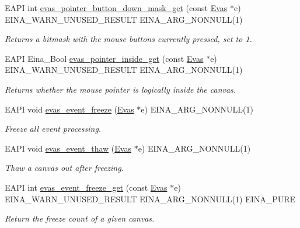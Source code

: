 \begin{DoxyCompactItemize}
EAPI int \hyperlink{group__Evas__Pointer__Group_gaae658f627d7f31b051345e45377c3580}{evas\_\-pointer\_\-button\_\-down\_\-mask\_\-get} (const \hyperlink{group__Evas__Canvas_ga5ff87cc4ce6bc43e3b640a6d37f73043}{Evas} $\ast$e) EINA\_\-WARN\_\-UNUSED\_\-RESULT EINA\_\-ARG\_\-NONNULL(1)
\begin{DoxyCompactList}\small\item\em Returns a bitmask with the mouse buttons currently pressed, set to 1. \item\end{DoxyCompactList}\item 
EAPI Eina\_\-Bool \hyperlink{group__Evas__Pointer__Group_ga39a1840fd43442c20f321437bd5f427a}{evas\_\-pointer\_\-inside\_\-get} (const \hyperlink{group__Evas__Canvas_ga5ff87cc4ce6bc43e3b640a6d37f73043}{Evas} $\ast$e) EINA\_\-WARN\_\-UNUSED\_\-RESULT EINA\_\-ARG\_\-NONNULL(1)
\begin{DoxyCompactList}\small\item\em Returns whether the mouse pointer is logically inside the canvas. \item\end{DoxyCompactList}\item 
EAPI void \hyperlink{group__Evas__Event__Freezing__Group_ga45fee3a26820b56527e434f6173c345e}{evas\_\-event\_\-freeze} (\hyperlink{group__Evas__Canvas_ga5ff87cc4ce6bc43e3b640a6d37f73043}{Evas} $\ast$e) EINA\_\-ARG\_\-NONNULL(1)
\begin{DoxyCompactList}\small\item\em Freeze all event processing. \item\end{DoxyCompactList}\item 
EAPI void \hyperlink{group__Evas__Event__Freezing__Group_ga4f08e6b3eece51bf285f1226629924e1}{evas\_\-event\_\-thaw} (\hyperlink{group__Evas__Canvas_ga5ff87cc4ce6bc43e3b640a6d37f73043}{Evas} $\ast$e) EINA\_\-ARG\_\-NONNULL(1)
\begin{DoxyCompactList}\small\item\em Thaw a canvas out after freezing. \item\end{DoxyCompactList}\item 
EAPI int \hyperlink{group__Evas__Event__Feeding__Group_gabc15f5115b4baaeafd2d144f307b6b64}{evas\_\-event\_\-freeze\_\-get} (const \hyperlink{group__Evas__Canvas_ga5ff87cc4ce6bc43e3b640a6d37f73043}{Evas} $\ast$e) EINA\_\-WARN\_\-UNUSED\_\-RESULT EINA\_\-ARG\_\-NONNULL(1) EINA\_\-PURE
\begin{DoxyCompactList}\small\item\em Return the freeze count of a given canvas. \item\end{DoxyCompactList}\item 

\end{DoxyCompactItemize}
